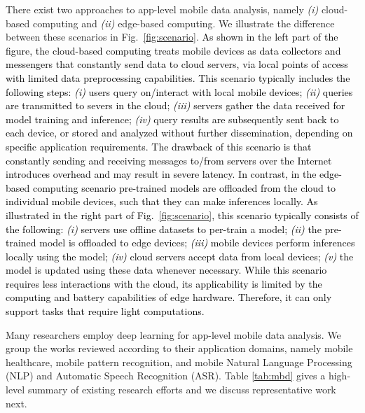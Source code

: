 \documentclass[journal,comsoc,letter]{IEEEtran}
\newcommand{\edit}[1]{\textcolor{black}{#1}}
\begin{document}
There exist two approaches to app-level mobile data analysis, namely \emph{(i)} cloud-based computing and \emph{(ii)} edge-based computing. We illustrate the difference between these scenarios in Fig.~\ref{fig:scenario}. \edit{As shown in the left part of the figure, the cloud-based computing treats mobile devices as data collectors and messengers that constantly send data to cloud servers, via local points of access with limited data preprocessing capabilities. This scenario typically includes the following steps: \emph{(i)} users query on/interact with local mobile devices; \emph{(ii)} queries are transmitted to severs in the cloud; \emph{(iii)} servers gather the data received for model training and inference; \emph{(iv)} query results are subsequently sent back to each device, or stored and analyzed without further dissemination, depending on specific application requirements. The drawback of this scenario is that constantly sending and receiving messages to/from servers over the Internet introduces overhead and may result in severe latency. In contrast, in the edge-based computing scenario pre-trained models are offloaded from the cloud to individual mobile devices, such that they can make inferences locally. As illustrated in the right part of  Fig.~\ref{fig:scenario}, this scenario typically consists of the following: \emph{(i)} servers use offline datasets to per-train a model; \emph{(ii)} the pre-trained model is offloaded to edge devices; \emph{(iii)} mobile devices perform inferences locally using the model; \emph{(iv)} cloud servers accept data from local devices; \emph{(v)} the model is updated using these data whenever necessary. While this scenario requires less interactions with the cloud, its applicability is limited by the computing and battery capabilities of edge hardware. Therefore, it can only support tasks that require light computations. }


Many researchers employ deep learning for app-level mobile data analysis. We group the works reviewed according to their application domains, namely mobile healthcare, mobile pattern recognition, and mobile Natural Language Processing (NLP) and Automatic Speech Recognition (ASR). Table \ref{tab:mbd} gives a high-level summary of existing research efforts and we discuss representative work next.\\
\end{document}
